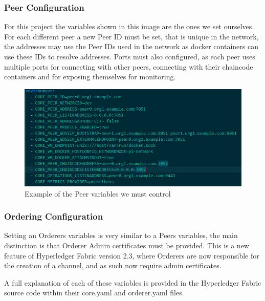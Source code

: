 \subsubsection{Peer Configuration}

For this project the variables shown in this image are the ones we set ourselves. For each different peer a new Peer ID must be set, that is unique in the network, the addresses may use the Peer IDs used in the network as docker containers can use these IDs to resolve addresses. Ports must also configured, as each peer uses multiple ports for connecting with other peers, connecting with their chaincode containers and for exposing themselves for monitoring.



\begin{figure}[h]
    \centering
    \includegraphics[width=1\columnwidth]{peer enviro.PNG}
    \caption{Example of the Peer variables we must control}
    \label{fig:my_label}
\end{figure}


\subsubsection{Ordering Configuration}

Setting an Orderers variables is very similar to a Peers variables, the main distinction is that Orderer Admin certificates must be provided. This is a new feature of Hyperledger Fabric version 2.3, where Orderers are now responsible for the creation of a channel, and as such now require admin certificates. 


A full explanation of each of these variables is provided in the Hyperledger Fabric source code within their core.yaml and orderer.yaml files.


